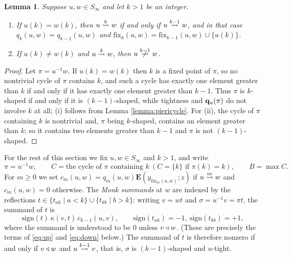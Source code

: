 \documentclass{amsart}
\newtheorem{lemma}{Lemma}[section]
\theoremstyle{definition}
\theoremstyle{remark}
\numberwithin{equation}{section}
\newcommand{\xrightsquigarrow}[2][]{%
	\mathrel{\mathop{\rightsquigarrow}\limits^{\scriptstyle #2}%
	\ifx\hfuzz#1\hfuzz\else_{\scriptstyle #1}\fi}%
}
\newcommand{\tom}[1]{\ensuremath{\xrightsquigarrow{#1}}}
\newcommand{\fx}{\mathrm{fix}}
\newcommand{\wte}{\mathbf{E}}
\begin{document}
\begin{lemma} \label{lemma:leveldichotomy}
Suppose $u,w\in S_\infty$ and let $k>1$ be an integer.
\begin{enumerate}
\item[(i)] If $u(k)=w(k)$, then $u\tom{k}w$ if and only if $u\tom{k-1}w$, and in that case $q_k(u,w)=q_{k-1}(u,w)$ and $\fx_k(u,w)=\fx_{k-1}(u,w)\cup\{u(k)\}$.
\item[(ii)] If $u(k)\neq w(k)$ and $u\tom{k}w$, then $u\ntom{k-1}w$.
\end{enumerate}
\end{lemma}
\begin{proof}
Let $\pi=u^{-1}w$. If $u(k)=w(k)$ then $k$ is a fixed point of $\pi$, so no nontrivial cycle of $\pi$ contains $k$, and such a cycle has exactly one element greater than $k$ if and only if it has exactly one element greater than $k-1$. Thus $\pi$ is $k$-shaped if and only if it is $(k-1)$-shaped, while tightness and $\mathbf{q}_u(\pi)$ do not involve $k$ at all; (i) follows from Lemma \ref{lemma:piericycle}. For (ii), the cycle of $\pi$ containing $k$ is nontrivial and, $\pi$ being $k$-shaped, contains an element greater than $k$; so it contains two elements greater than $k-1$ and $\pi$ is not $(k-1)$-shaped.
\end{proof}

For the rest of this section we fix $u,w\in S_\infty$ and $k>1$, and write
$$\pi=u^{-1}w,\qquad C=\text{the cycle of }\pi\text{ containing }k\ (C=\{k\}\text{ if }\pi(k)=k),\qquad B=\max C.$$
For $m\geq0$ we set $c_m(u,w)=q_m(u,w)\wte(y_{\fx_m(u,w)};z)$ if $u\tom{m}w$ and $c_m(u,w)=0$ otherwise. The \emph{Monk summands} at $w$ are indexed by the reflections $t\in\{t_{ak}\mid a<k\}\cup\{t_{kb}\mid b>k\}$: writing $v=wt$ and $\sigma=u^{-1}v=\pi t$, the summand of $t$ is
$$\mathrm{sign}(t)\,\kappa(v,t)\,c_{k-1}(u,v),\qquad \mathrm{sign}(t_{ak})=-1,\ \mathrm{sign}(t_{kb})=+1,$$
where the summand is understood to be $0$ unless $v\triangleleft w$. (These are precisely the terms of \eqref{eq:up} and \eqref{eq:down} below.) The summand of $t$ is therefore nonzero if and only if $v\triangleleft w$ and $u\tom{k-1}v$, that is, $\sigma$ is $(k-1)$-shaped and $u$-tight.
\end{document}
